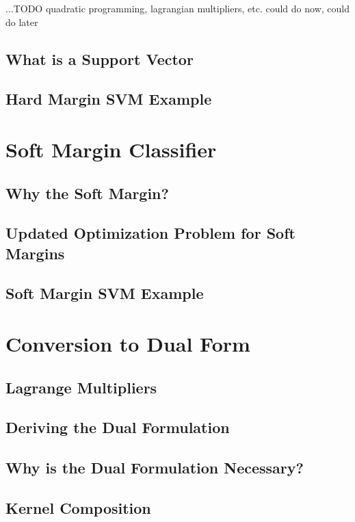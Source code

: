 ...TODO quadratic programming, lagrangian multipliers, etc. could do now, could do later


\subsection{What is a Support Vector}
\subsection{Hard Margin SVM Example}

\section{Soft Margin Classifier}
\subsection{Why the Soft Margin?}
\subsection{Updated Optimization Problem for Soft Margins}
\subsection{Soft Margin SVM Example}

\section{Conversion to Dual Form}
\subsection{Lagrange Multipliers}
\subsection{Deriving the Dual Formulation}
\subsection{Why is the Dual Formulation Necessary?}
\subsection{Kernel Composition}
